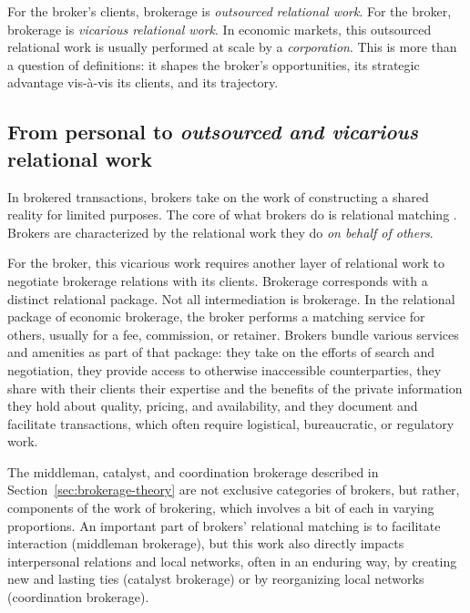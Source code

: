 \documentclass[
]{article}
\begin{document}
For the broker's clients, brokerage is \emph{outsourced} \emph{relational work}. For the broker, brokerage is \emph{vicarious relational work}. In economic markets, this outsourced relational work is usually performed at scale by a \emph{corporation}. This is more than a question of definitions: it shapes the broker's opportunities, its strategic advantage vis-à-vis its clients, and its trajectory.

\subsection{\texorpdfstring{From personal to \emph{outsourced and vicarious} relational work}{From personal to outsourced and vicarious relational work}}

In brokered transactions, brokers take on the work of constructing a shared reality for limited purposes. The core of what brokers do is relational matching \autocite[see][]{zelizerHowBecameRelational2012}. Brokers are characterized by the relational work they do \emph{on behalf of others}.

For the broker, this vicarious work requires another layer of relational work to negotiate brokerage relations with its clients. Brokerage corresponds with a distinct relational package. Not all intermediation is brokerage. In the relational package of economic brokerage, the broker performs a matching service for others, usually for a fee, commission, or retainer. Brokers bundle various services and amenities as part of that package: they take on the efforts of search and negotiation, they provide access to otherwise inaccessible counterparties, they share with their clients their expertise and the benefits of the private information they hold about quality, pricing, and availability, and they document and facilitate transactions, which often require logistical, bureaucratic, or regulatory work.

The middleman, catalyst, and coordination brokerage described in Section~\ref{sec:brokerage-theory} are not exclusive categories of brokers, but rather, components of the work of brokering, which involves a bit of each in varying proportions. An important part of brokers' relational matching is to facilitate interaction (middleman brokerage), but this work also directly impacts interpersonal relations and local networks, often in an enduring way, by creating new and lasting ties (catalyst brokerage) or by reorganizing local networks (coordination brokerage).
\end{document}

